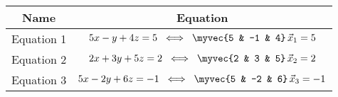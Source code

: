 \begin{tabular}{|c|c|}
\hline
\textbf{Name} & \textbf{Equation} \\
\hline
Equation 1 & $5x - y + 4z = 5 \;\;\Longleftrightarrow\;\; \myvec{5 & -1 & 4}\,\vec{x}_1 = 5$ \\ \hline
Equation 2 & $2x + 3y +5z = 2 \;\;\Longleftrightarrow\;\; \myvec{2 & 3 & 5}\,\vec{x}_2 = 2$ \\ \hline
Equation 3 & $5x - 2y + 6z = -1 \;\;\Longleftrightarrow\;\; \myvec{5 & -2 & 6}\,\vec{x}_3 = -1$ \\ \hline
\end{tabular}